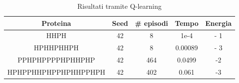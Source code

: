 \documentclass[conference]{IEEEtran}
\begin{document}
\begin{table}[h]
\begin{center}
\begin{tabular}{|c|c|c|c|c|}
\hline
\textbf{Proteina} & \textbf{Seed} & \textbf{\# episodi} & \textbf{Tempo} & \textbf{Energia} \\ \hline
HHPH & 42 & 8 & 1e-4 & - 1 \\ \hline
HPHHPHHPH & 42 & 8 & 0.00089 & - 3 \\ \hline
PPHPHPPPPHPHHPHP & 42 & 464 & 0.0499 & -2 \\ \hline
HPHPPHHPHPPHPHHPPHPH & 42 & 402 & 0.061 & -3 \\ \hline
\end{tabular}
\caption{Risultati tramite Q-learning}
\end{center}
\end{table}
\end{document}
